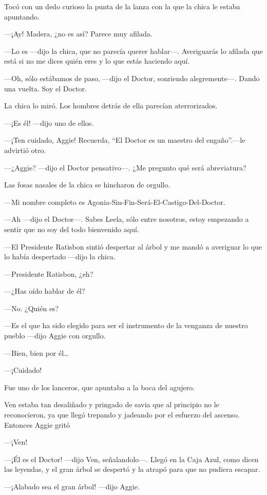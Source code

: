 Tocó con un dedo curioso la punta de la lanza con la que la chica le
estaba apuntando.

---¡Ay! Madera, ¿no es así? Parece muy afilada.

---Lo es ---dijo la chica, que no parecía querer hablar---. Averiguarás
lo afilada que está si no me dices quién eres y lo que estás haciendo
aquí.

---Oh, sólo estábamos de paso, ---dijo el Doctor, sonriendo
alegremente---. Dando una vuelta. Soy el Doctor.

La chica lo miró. Los hombres detrás de ella parecían aterrorizados.

---¡Es él! ---dijo uno de ellos.

---¡Ten cuidado, Aggie! Recuerda, ``El Doctor es un maestro del
engaño''.---le advirtió otro.

---¿Aggie? ---dijo el Doctor pensativo---. ¿Me pregunto qué será
abreviatura?

Las fosas nasales de la chica se hincharon de orgullo.

---Mi nombre completo es Agonia-Sin-Fin-Será-El-Castigo-Del-Doctor.

---Ah ---dijo el Doctor---. Sabes Leela, sólo entre nosotros, estoy
empezando a sentir que no soy del todo bienvenido aquí.

---El Presidente Ratisbon sintió despertar al árbol y me mandó a
averiguar lo que lo había despertado ---dijo la chica.

---Presidente Ratisbon, ¿eh?

---¿Has oído hablar de él?

---No. ¿Quién es?

---Es el que ha sido elegido para ser el instrumento de la venganza de
nuestro pueblo ---dijo Aggie con orgullo.

---Bien, bien por él\ldots{}

---¡Cuidado!

Fue uno de los lanceros, que apuntaba a la boca del agujero.

Ven estaba tan desaliñado y pringado de savia que al principio no le
reconocieron, ya que llegó trepando y jadeando por el esfuerzo del
ascenso. Entonces Aggie gritó

---¡Ven!

---¡Él es el Doctor! ---dijo Ven, señalandolo---. Llegó en la Caja Azul,
como dicen las leyendas, y el gran árbol se despertó y la atrapó para
que no pudiera escapar.

---¡Alabado sea el gran árbol! ---dijo Aggie.

